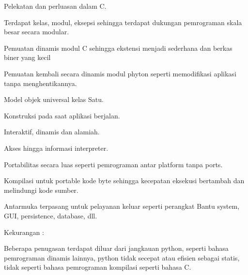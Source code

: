 \noindent 
{\fontsize{14pt}{14pt}\selectfont Pelekatan dan perluasan dalam C. \\} \par
\noindent 
{\fontsize{14pt}{14pt}\selectfont Terdapat kelas, modul, eksepsi sehingga terdapat dukungan pemrograman skala besar secara modular. \\} \par
\noindent 
{\fontsize{14pt}{14pt}\selectfont Pemuatan dinamis modul C sehingga ekstensi menjadi sederhana dan berkas biner yang kecil \\} \par
\noindent 
{\fontsize{14pt}{14pt}\selectfont Pemuatan kembali secara dinamis modul phyton seperti memodifikasi aplikasi tanpa menghentikannya. \\} \par
\noindent 
{\fontsize{14pt}{14pt}\selectfont Model objek universal kelas Satu. \\} \par
\noindent 
{\fontsize{14pt}{14pt}\selectfont Konstruksi pada saat aplikasi berjalan. \\} \par
\noindent 
{\fontsize{14pt}{14pt}\selectfont Interaktif, dinamis dan alamiah. \\} \par
\noindent 
{\fontsize{14pt}{14pt}\selectfont Akses hingga informasi interpreter. \\} \par
\noindent 
{\fontsize{14pt}{14pt}\selectfont Portabilitas secara luas seperti pemrograman antar platform tanpa ports. \\} \par
\noindent 
{\fontsize{14pt}{14pt}\selectfont Kompilasi untuk portable kode byte sehingga kecepatan eksekusi bertambah dan melindungi kode sumber. \\} \par
\noindent 
{\fontsize{14pt}{14pt}\selectfont Antarmuka terpasang untuk pelayanan keluar seperti perangkat Bantu system, GUI, persistence, database, dll. \\} \par
\noindent 
{\fontsize{14pt}{14pt}\selectfont Kekurangan : \\} \par
\noindent 
{\fontsize{14pt}{14pt}\selectfont Beberapa penugasan terdapat diluar dari jangkauan python, seperti bahasa pemrograman dinamis lainnya, python tidak secepat atau efisien sebagai statis, tidak seperti bahasa pemrograman kompilasi seperti bahasa C. \\} \par
